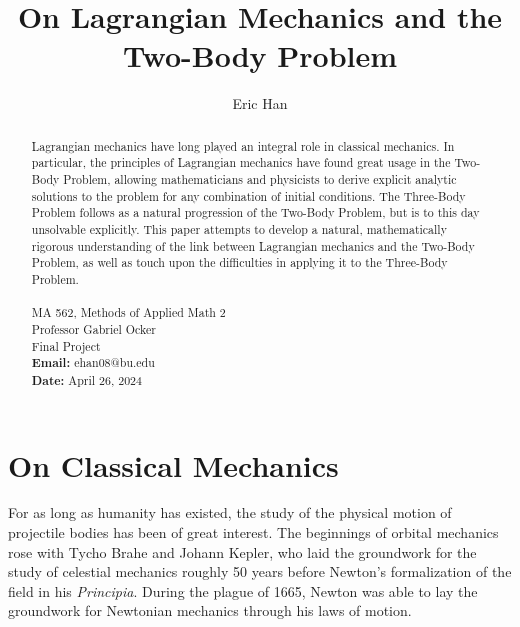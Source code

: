 \documentclass[10pt, psamsfonts]{amsart}
\title{On Lagrangian Mechanics and the Two-Body Problem}
\author{Eric Han}
\theoremstyle{definition}
\theoremstyle{remark}
\numberwithin{equation}{section}
\begin{document}
\begin{abstract}
Lagrangian mechanics have long played an integral role in classical mechanics. In particular, the principles of Lagrangian mechanics have found great usage in the Two-Body Problem, allowing mathematicians and physicists to derive explicit analytic solutions to the problem for any combination of initial conditions. The Three-Body Problem follows as a natural progression of the Two-Body Problem, but is to this day unsolvable explicitly. This paper attempts to develop a natural, mathematically rigorous understanding of the link between Lagrangian mechanics and the Two-Body Problem, as well as touch upon the difficulties in applying it to the Three-Body Problem.
\\\\
\noindent MA 562, Methods of Applied Math 2 \\
\noindent Professor Gabriel Ocker \\
\noindent Final Project\\
\noindent \textbf{Email:} ehan08@bu.edu\\
\noindent \textbf{Date:} April 26, 2024
\end{abstract}

\maketitle
\tableofcontents
\newpage

\section*{On Classical Mechanics}
For as long as humanity has existed, the study of the physical motion of projectile bodies has been of great interest. The beginnings of orbital mechanics rose with Tycho Brahe and Johann Kepler, who laid the groundwork for the study of celestial mechanics roughly 50 years before Newton's formalization of the field in his \textit{Principia}. During the plague of 1665, Newton was able to lay the groundwork for Newtonian mechanics through his laws of motion.
\end{document}
